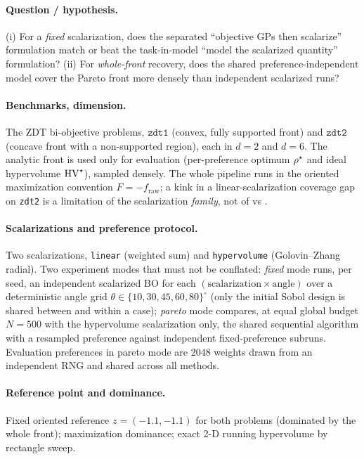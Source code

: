 \paragraph{Question / hypothesis.}
(i) For a \emph{fixed} scalarization, does the separated ``objective GPs then
scalarize'' formulation match or beat the task-in-model ``model the scalarized
quantity'' formulation? (ii) For \emph{whole-front} recovery, does the shared
preference-independent model cover the Pareto front more densely than independent
scalarized runs?

\paragraph{Benchmarks, dimension.}
The ZDT bi-objective problems, $\texttt{zdt1}$ (convex, fully supported front)
and $\texttt{zdt2}$ (concave front with a non-supported region), each in $d=2$
and $d=6$. The analytic front is used only for evaluation (per-preference optimum
$\rho^\star$ and ideal hypervolume $\operatorname{HV}^\star$), sampled densely. The whole
pipeline runs in the oriented maximization convention $F=-f_{\mathrm{raw}}$; a
kink in a linear-scalarization coverage gap on \texttt{zdt2} is a limitation of
the scalarization \emph{family}, not of \RIGHT{} vs \WRONG.

\paragraph{Scalarizations and preference protocol.}
Two scalarizations, \texttt{linear} (weighted sum) and \texttt{hypervolume}
(Golovin--Zhang radial). Two experiment modes that must not be conflated:
\emph{fixed} mode runs, per seed, an independent scalarized BO for each
$(\text{scalarization}\times\text{angle})$ over a deterministic angle grid
$\theta\in\{10,30,45,60,80\}^\circ$ (only the initial Sobol design is shared
between \RIGHT{} and \WRONG{} within a case); \emph{pareto} mode compares, at
equal global budget $N=500$ with the hypervolume scalarization only, the shared
sequential algorithm with a resampled preference against independent
fixed-preference subruns. Evaluation preferences in pareto mode are $2048$
weights drawn from an independent RNG and shared across all methods.

\paragraph{Reference point and dominance.}
Fixed oriented reference $z=(-1.1,-1.1)$ for both problems (dominated by the whole
front); maximization dominance; exact 2-D running hypervolume by rectangle sweep.

